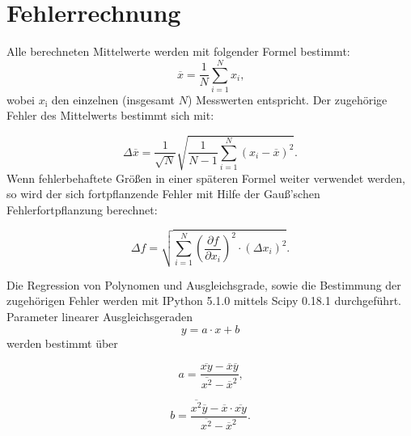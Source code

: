 \section{Fehlerrechnung}
\label{sec:fehlerrechnung}
Alle berechneten Mittelwerte werden mit folgender Formel bestimmt:
\begin{equation}
  \label{eqn:mittelwert}
	\overline x=\frac{1}{N}\sum \limits_{i=1}^{N} x_i \text{,}
\end{equation}
wobei $x_{\text{i}}$ den einzelnen (insgesamt $N$) Messwerten entspricht.
Der zugehörige Fehler des Mittelwerts bestimmt sich mit:

\begin{equation}
  \label{eqn:mittelwertfehler}
  \Delta \overline x= \frac{1}{\sqrt{N}} \sqrt{\frac{1}{N-1} \sum \limits_{i=1}^{N} (x_i- \overline x)^2}.
\end {equation}
Wenn fehlerbehaftete Größen in einer späteren Formel weiter verwendet werden, so wird der sich fortpflanzende Fehler
mit Hilfe der Gauß’schen Fehlerfortpflanzung berechnet:

\begin{equation}
  \label{eqn:fehlerfortpflanzung}
  \Delta f = \sqrt{ \sum \limits_{i = 1}^{N} (\frac{\partial f}{\partial x_i})^2 \cdot (\Delta x_i)^2}.
\end{equation}

Die Regression von Polynomen und Ausgleichsgrade, sowie die Bestimmung der zugehörigen Fehler werden mit
IPython 5.1.0 mittels Scipy 0.18.1 durchgeführt.
Parameter linearer Ausgleichsgeraden
\begin{equation}
\label{eqn:ausgleichsgrade}
y=a \cdot x +b
\end{equation}
werden bestimmt über

\begin{equation}
\label{eqn:ausgleichsgrade_a}
	a= \frac{ \overline{xy}- \overline{x} \overline{y}}{\overline{x^2}-\overline{x}^2} \text{,}
\end{equation}

\begin{equation}
\label{eqn:ausgleichsgrade_b}
	b= \frac{ \overline{x^2} \overline{y}- \overline{x} \cdot \overline{xy}}{\overline{x^2}-\overline{x}^2} \text{.}
\end{equation}

